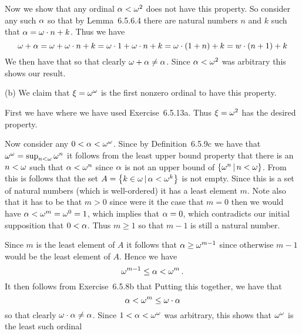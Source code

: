 \begin{solution}
    Now we show that any ordinal $\alpha < \omega^2$ does not have this property.
    So consider any such $\alpha$ so that by Lemma~6.5.6.4 there are natural numbers $n$ and $k$ such that $\alpha = \omega \cdot n + k$.
    Thus we have
    $$
    \omega + \alpha = \omega + \omega \cdot n + k = \omega \cdot 1 + \omega \cdot n + k = \omega \cdot (1 + n) + k = w \cdot (n + 1) + k
    $$
    We then have that
    so that clearly $\omega + \alpha \neq \alpha$.
    Since $\alpha < \omega^2$ was arbitrary this shows our result. \qedsymbol

    (b) We claim that $\xi = \omega^\omega$ is the first nonzero ordinal to have this property.

    First we have
    where we have used Exercise~6.5.13a.
    Thus $\xi = \omega^2$ has the desired property.

    Now consider any $0 < \alpha < \omega^\omega$.
    Since by Definition~6.5.9c we have that $\omega^\omega = \sup_{n < \omega} \omega^n$ it follows from the least upper bound property that there is an $n < \omega$ such that $\alpha < \omega^n$ since $\alpha$ is not an upper bound of $\left\{ \omega^n \,|\, n < \omega \right\}$.
    From this is follows that the set $A = \left\{ k \in \omega \,|\, \alpha < \omega^k \right\}$ is not empty.
    Since this is a set of natural numbers (which is well-ordered) it has a least element $m$.
    Note also that it has to be that $m > 0$ since were it the case that $m=0$ then we would have $\alpha < \omega^m = \omega^0 = 1$, which implies that $\alpha = 0$, which contradicts our initial supposition that $0 < \alpha$.
    Thus $m \geq 1$ so that $m-1$ is still a natural number.

    Since $m$ is the least element of $A$ it follows that $\alpha \geq \omega^{m-1}$ since otherwise $m-1$ would be the least element of $A$.
    Hence we have
    $$
    \omega^{m-1} \leq \alpha < \omega^m \,.
    $$
    It then follows from Exercise~6.5.8b that
    Putting this together, we have that
    $$
    \alpha < \omega^m \leq \omega \cdot \alpha
    $$
    so that clearly $\omega \cdot \alpha \neq \alpha$.
    Since $1 < \alpha < \omega^\omega$ was arbitrary, this shows that $\omega^\omega$ is the least such ordinal \qedsymbol


\end{solution}
